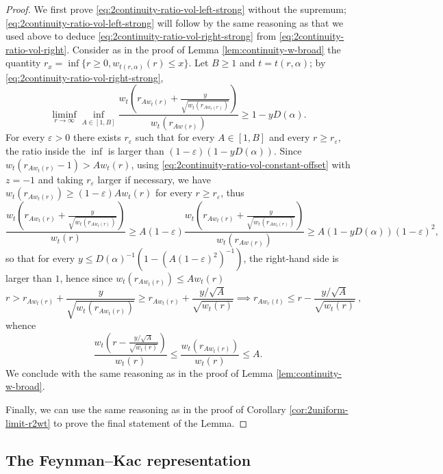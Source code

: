 \documentclass[10pt,a4paper]{article}
\begin{document}
\begin{proof}
We first prove \eqref{eq:2continuity-ratio-vol-left-strong} without the supremum; \eqref{eq:2continuity-ratio-vol-left-strong} will follow by the same reasoning as that we used above to deduce \eqref{eq:2continuity-ratio-vol-right-strong} from \eqref{eq:2continuity-ratio-vol-right}. 
Consider as in the proof of Lemma \ref{lem:continuity-w-broad} the quantity $r_{x} = \inf\{ r \geq 0, w_{t(r,\alpha)}(r) \leq x\}$. Let $B\geq 1$ and $t=t(r,\alpha)$; 
by \eqref{eq:2continuity-ratio-vol-right-strong}, 
\[ \liminf_{r\to\infty} \inf_{A \in[1,B]} \frac{w_t\left(r_{Aw_t(r)} + \frac{y}{\sqrt{w_t(r_{Aw_t(r)})}}\right)}{w_t(r_{Aw(r)})} \geq 1 - y D(\alpha) . \]
For every $\varepsilon>0$ there exists $r_\varepsilon$ such that for every $A\in [1,B]$ and every $r\geq r_\varepsilon$, the ratio inside the $\inf$ is larger than $(1-\varepsilon) (1-y D(\alpha))$. Since $w_t(r_{Aw_t(r)}-1)>Aw_t(r)$, using \eqref{eq:2continuity-ratio-vol-constant-offset} with $z=-1$ and taking $r_\varepsilon$ larger if necessary, we have $w_t(r_{Aw_t(r)}) \geq (1-\varepsilon) Aw_t(r)$ for every $r\geq r_\varepsilon$, thus 
\[ \frac{w_t\left(r_{Aw_t(r)} + \frac{y}{\sqrt{w_t(r_{Aw_t(r)})}}\right)}{w_t(r)} \geq A(1-\varepsilon) \frac{w_t\left(r_{Aw_t(r)} + \frac{y}{\sqrt{w_t(r_{Aw_t(r)})}}\right)}{w_t(r_{Aw(r)})} \geq A (1-y D(\alpha)) (1-\varepsilon)^2 , \]
so that for every $y\leq D(\alpha)^{-1}(1 - (A(1-\varepsilon)^2)^{-1})$, the right-hand side is larger than $1$, hence since $w_t(r_{Aw_t(r)}) \leq A w_t(r)$
\[ r > r_{Aw_t(r)} + \frac{y}{\sqrt{w_t(r_{Aw_t(r)})}} \geq r_{Aw_t(r)} + \frac{y/\sqrt{A}}{\sqrt{w_t(r)}} \implies r_{Aw_r(t)} \leq r - \frac{y/\sqrt{A}}{\sqrt{w_t(r)}} \ , \] 
whence 
\[ \frac{w_t\left( r - \frac{y/\sqrt{A}}{\sqrt{w_t(r)}} \right)}{w_t(r)} \leq \frac{w_t(r_{Aw_t(r)})}{w_t(r)} \leq A . \]
We conclude with the same reasoning as in the proof of Lemma \ref{lem:continuity-w-broad}. 

Finally, we can use the same reasoning as in the proof of Corollary \ref{cor:2uniform-limit-r2wt} to prove the final statement of the Lemma. 
\end{proof}






\subsection{The Feynman--Kac representation}
\label{sec:Feynman-Kac-volume}
\end{document}
